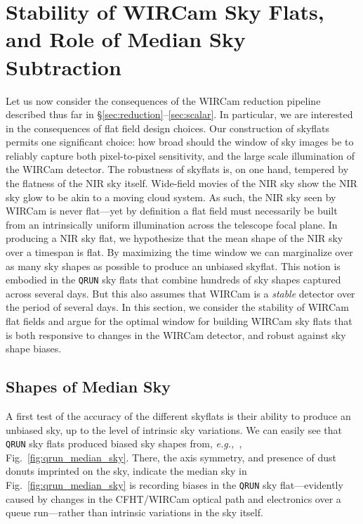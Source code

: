 \documentclass[iop]{emulateapj}
\newcommand{\eg}{\textit{e.g.,~}}
\newcommand{\Fig}[1]{Fig.~\ref{fig:#1}}  %
\newcommand{\Sec}[1]{\S\ref{sec:#1}}  %
\begin{document}
\section{Stability of WIRCam Sky Flats, and Role of Median Sky Subtraction}
\label{sec:skyflatstability}

Let us now consider the consequences of the WIRCam reduction pipeline described thus far in \Sec{reduction}--\ref{sec:scalar}.
In particular, we are interested in the consequences of flat field design choices.
Our construction of skyflats permits one significant choice: how broad should the window of sky images be to reliably capture both pixel-to-pixel sensitivity, and the large scale illumination of the WIRCam detector.
The robustness of skyflats is, on one hand, tempered by the flatness of the NIR sky itself.
Wide-field movies of the NIR sky \citep{Adams:1996} show the NIR sky glow to be akin to a moving cloud system.
As such, the NIR sky seen by WIRCam is never flat—yet by definition a flat field must necessarily be built from an intrinsically uniform illumination across the telescope focal plane.
In producing a NIR sky flat, we hypothesize that the mean shape of the NIR sky over a timespan is flat.
By maximizing the time window we can marginalize over as many sky shapes as possible to produce an unbiased skyflat.
This notion is embodied in the \texttt{QRUN} sky flats that combine hundreds of sky shapes captured across several days.
But this also assumes that WIRCam is a \emph{stable} detector over the period of several days.
In this section, we consider the stability of WIRCam flat fields and argue for the optimal window for building WIRCam sky flats that is both responsive to changes in the WIRCam detector, and robust against sky shape biases.

\subsection{Shapes of Median Sky}
\label{sec:medianskyshapes}


A first test of the accuracy of the different skyflats is their ability to produce an unbiased sky, up to the level of intrinsic sky variations.
We can easily see that \texttt{QRUN} sky flats produced biased sky shapes from, \eg, \Fig{qrun_median_sky}.
There, the axis symmetry, and presence of dust donuts imprinted on the sky, indicate the median sky in \Fig{qrun_median_sky} is recording biases in the \texttt{QRUN} sky flat---evidently caused by changes in the CFHT/WIRCam optical path and electronics over a queue run---rather than intrinsic variations in the sky itself.
\end{document}
